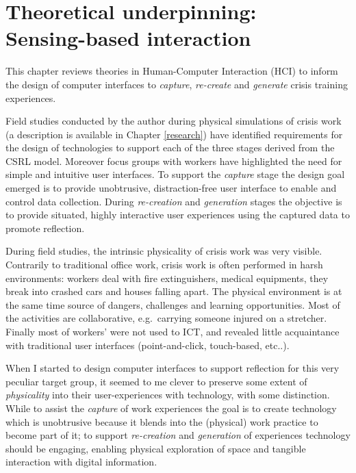 \chapter{Theoretical underpinning:\\Sensing-based interaction}\label{interaction}


This chapter reviews theories in Human-Computer Interaction (HCI) to inform the design of computer interfaces to \emph{capture}, \emph{re-create} and \emph{generate} crisis training experiences.

Field studies conducted by the author during physical simulations of crisis work (a description is available in Chapter \ref{research}) have identified requirements for the design of technologies to support each of the three stages derived from the CSRL model. Moreover focus groups with workers have highlighted the need for simple and intuitive user interfaces. To support the \emph{capture} stage the design goal emerged is to provide unobtrusive, distraction-free user interface to enable and control data collection. During \emph{re-creation} and \emph{generation} stages the objective is to provide situated, highly interactive user experiences using the captured data to promote reflection.

During field studies, the intrinsic physicality of crisis work was very visible. Contrarily to traditional office work, crisis work is often performed in harsh environments: workers deal with fire extinguishers, medical equipments, they break into crashed cars and houses falling apart. The physical environment is at the same time source of dangers, challenges and learning opportunities. Most of the activities are collaborative, e.g.~carrying someone injured on a stretcher. Finally most of workers' were not used to ICT, and revealed little acquaintance with traditional user interfaces (point-and-click, touch-based, etc..).

When I started to design computer interfaces to support reflection for this very peculiar target group, it seemed to me clever to preserve some extent of \emph{physicality} into their user-experiences with technology, with some distinction. While to assist the \emph{capture} of work experiences the goal is to create technology which is unobtrusive because it blends into the (physical) work practice to become part of it; to support \emph{re-creation} and \emph{generation} of experiences technology should be engaging, enabling physical exploration of space and tangible interaction with digital information.

